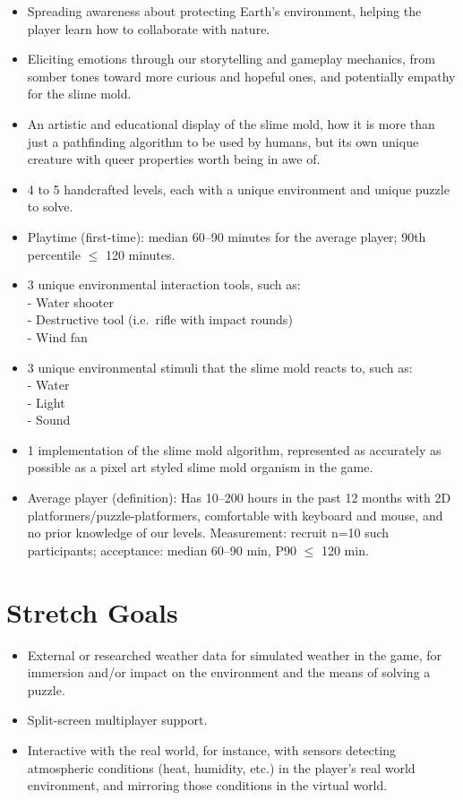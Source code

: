 \documentclass{article}
\begin{document}
\begin{itemize}
\item{Spreading awareness about protecting Earth's environment, 
helping the player learn how to collaborate with nature.}
\item{Eliciting emotions through our storytelling and gameplay mechanics, 
from somber tones toward more curious and hopeful ones, and potentially empathy 
for the slime mold.}
\item{An artistic and educational display of the slime mold, how it is more than 
just a pathfinding algorithm to be used by humans, but its own unique creature with 
queer properties worth being in awe of.}
\item{4 to 5 handcrafted levels, each with a unique environment and unique puzzle to solve.}
\item{Playtime (first-time): median 60--90 minutes for the average player; 
90th percentile $\leq$ 120 minutes.}
\item{3 unique environmental interaction tools, such as:\\ 
- Water shooter\\ 
- Destructive tool (i.e.\ rifle with impact rounds)\\ 
- Wind fan}
\item{3 unique environmental stimuli that the slime mold reacts to, such as:\\ 
- Water\\ 
- Light\\ 
- Sound}
\item{1 implementation of the slime mold algorithm, represented as accurately as possible as a
pixel art styled slime mold organism in the game.}
\item{Average player (definition): Has 10--200 hours in the past 12 months with 
2D platformers/puzzle-platformers, comfortable with keyboard and mouse, 
and no prior knowledge of our levels. Measurement: recruit n=10 such participants; 
acceptance: median 60--90 min, P90 $\leq$ 120 min.}
\end{itemize}

\section{Stretch Goals}

\begin{itemize}
\item{External or researched weather data for simulated weather in the game, for immersion and/or impact on the environment and the means of solving a puzzle.}
\item{Split-screen multiplayer support.}
\item{Interactive with the real world, for instance, with sensors detecting atmospheric conditions (heat, humidity, etc.) in the player’s real world environment, and mirroring those conditions in the virtual world.}
\end{itemize}
\end{document}
